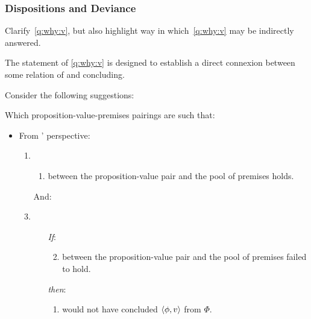 \subsubsection{Dispositions and Deviance}
\label{cha:clarification:sec:dis-and-dev}

\begin{note}
  Clarify~\autoref{q:why:v}, but also highlight way in which~\autoref{q:why:v} may be indirectly answered.
\end{note}

\begin{note}
  The statement of \autoref{q:why:v} is designed to establish a direct connexion between some relation of \support{} and concluding.

  Consider the following suggestions:

  \begin{question}
    \label{q:why:v:perspective}
    Which proposition-value-premises pairings are such that:
    \begin{itemize}
    \item
      From \vAgent{}' perspective:
      \begin{enumerate}[label=]
      \item
        \begin{enumerate}[label=\alph*., ref=(\alph*)]
        \item
           between the proposition-value pair and the pool of premises holds.
        \end{enumerate}
      \item[And:]
      \item
        \begin{enumerate}
        \item[\emph{If}:]
          \begin{enumerate}[label=\alph*., ref=(\alph*), resume]
            \setcounter{enumiii}{1}
          \item
             between the proposition-value pair and the pool of premises failed to hold.
          \end{enumerate}
        \item[\emph{then}:]
          \begin{enumerate}[label=\alph*., ref=(\alph*), resume]
          \item \vAgent{} would not have concluded \(\langle \phi, v \rangle\) from \(\Phi\).
          \end{enumerate}
        \end{enumerate}
      \end{enumerate}
    \end{itemize}
  \end{question}


\end{note}

